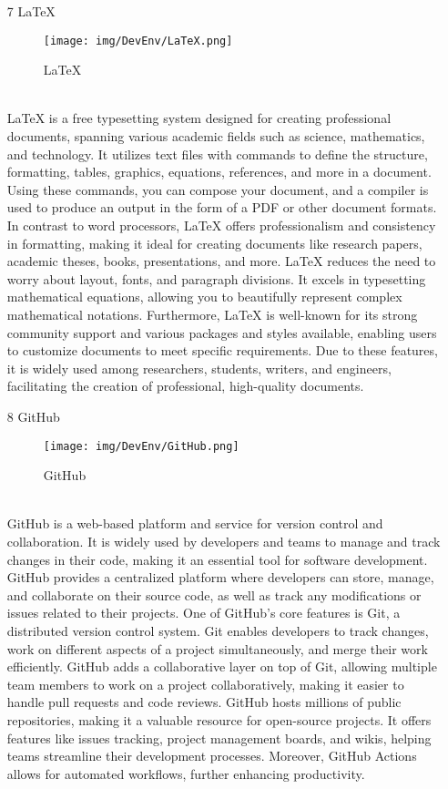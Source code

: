 \documentclass[conference]{IEEEtran}
\begin{document}
\begin{enumerate}
\item[7] LaTeX
\begin{figure}[h]
\centering
\texttt{[image: img/DevEnv/LaTeX.png]}
\caption{LaTeX} 
\end{figure}\\
LaTeX is a free typesetting system designed for creating professional documents, spanning various academic fields such as science, mathematics, and technology. It utilizes text files with commands to define the structure, formatting, tables, graphics, equations, references, and more in a document. Using these commands, you can compose your document, and a compiler is used to produce an output in the form of a PDF or other document formats.
In contrast to word processors, LaTeX offers professionalism and consistency in formatting, making it ideal for creating documents like research papers, academic theses, books, presentations, and more. LaTeX reduces the need to worry about layout, fonts, and paragraph divisions. It excels in typesetting mathematical equations, allowing you to beautifully represent complex mathematical notations.
Furthermore, LaTeX is well-known for its strong community support and various packages and styles available, enabling users to customize documents to meet specific requirements. Due to these features, it is widely used among researchers, students, writers, and engineers, facilitating the creation of professional, high-quality documents.\\

\item[8] GitHub
\begin{figure}[h]
\centering
\texttt{[image: img/DevEnv/GitHub.png]}
\caption{GitHub} 
\end{figure}\\
GitHub is a web-based platform and service for version control and collaboration. It is widely used by developers and teams to manage and track changes in their code, making it an essential tool for software development. GitHub provides a centralized platform where developers can store, manage, and collaborate on their source code, as well as track any modifications or issues related to their projects.
One of GitHub's core features is Git, a distributed version control system. Git enables developers to track changes, work on different aspects of a project simultaneously, and merge their work efficiently. GitHub adds a collaborative layer on top of Git, allowing multiple team members to work on a project collaboratively, making it easier to handle pull requests and code reviews.
GitHub hosts millions of public repositories, making it a valuable resource for open-source projects. It offers features like issues tracking, project management boards, and wikis, helping teams streamline their development processes. Moreover, GitHub Actions allows for automated workflows, further enhancing productivity.\\


\end{enumerate}
\end{document}
